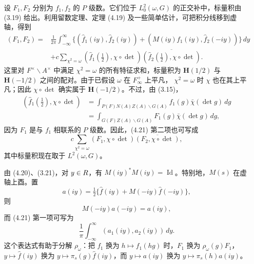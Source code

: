 设 $F_1,F_2$ 分别为 $f_1,f_2$ 的 $P$ 级数。它们位于 $L_0^2(\omega,G)$ 的正交补中，标量积由
(3.19) 给出。利用留数定理、定理 (4.19) 及一些简单估计，可把积分线移到虚轴，得到
\begin{equation}
\begin{split}
 (F_1,F_2)={}&\frac1{2\pi}\int_{-\infty}^{\infty}
 \{(\widehat f_1(iy),\widehat f_2(iy))
 +(M(iy)\widehat f_1(iy),\widehat f_2(-iy))\}\,dy\\
 &+c\sum_{\chi^2=\omega}(\widehat f_1(\tfrac12),\chi\circ\det)
 \overline{(\widehat f_2(\tfrac12),\chi\circ\det)}.
\end{split}\tag{4.21}
\end{equation}
这里对 $F^\times\backslash A^\times$ 中满足 $\chi^2=\omega$ 的所有特征求和，标量积为
$\mathbf H(1/2)$ 与 $\mathbf H(-1/2)$ 之间的配对。由于已假设 $\omega$ 在 $F_\infty^+$ 上平凡，
$\chi^2=\omega$ 时 $\chi$ 也在其上平凡；因此 $\chi\circ\det$ 确实属于 $\mathbf H(-1/2)$。不过，由 (3.15)，
\[
\begin{aligned}
 (\widehat f_1(\tfrac12),\chi\circ\det)
 &=\int_{P(F)N(A)Z(A)\backslash G(A)}f_1(g)\bar\chi(\det g)\,dg\\
 &=\int_{G(F)Z(A)\backslash G(A)}F_1(g)\bar\chi(\det g)\,dg,
\end{aligned}
\]
因为 $F_1$ 是与 $f_1$ 相联系的 $P$ 级数。因此，(4.21) 第二项也可写成
\begin{equation}
 c\sum_{\chi^2=\omega}(F_1,\chi\circ\det)\overline{(F_2,\chi\circ\det)},\tag{4.22}
\end{equation}
其中标量积现在取于 $L^2(\omega,G)$。

由 (4.20)、(3.21)，对 $y\in R$，有 $M(iy)^*M(iy)=\operatorname{Id}$。特别地，$M(s)$ 在虚轴上酉。置
\begin{equation}
 a(iy)=\tfrac12\{\widehat f(iy)+M(-iy)\widehat f(-iy)\},\tag{4.23}
\end{equation}
则
\begin{equation}
 M(-iy)a(-iy)=a(iy),\tag{4.24}
\end{equation}
而 (4.21) 第一项可写为
\begin{equation}
 \frac1\pi\int_{-\infty}^{\infty}(a_1(iy),a_2(iy))\,dy.\tag{4.25}
\end{equation}
这个表达式有助于分解 $\rho_\omega$：把 $f_1$ 换为 $h\mapsto f_1(hg)$ 时，$F_1$ 换为
$\rho_\omega(g)F_1$，$y\mapsto\widehat f(iy)$ 换为 $y\mapsto\pi_s(g)\widehat f(iy)$，而
$y\mapsto a(iy)$ 换为 $y\mapsto\pi_s(h)a(iy)$。

